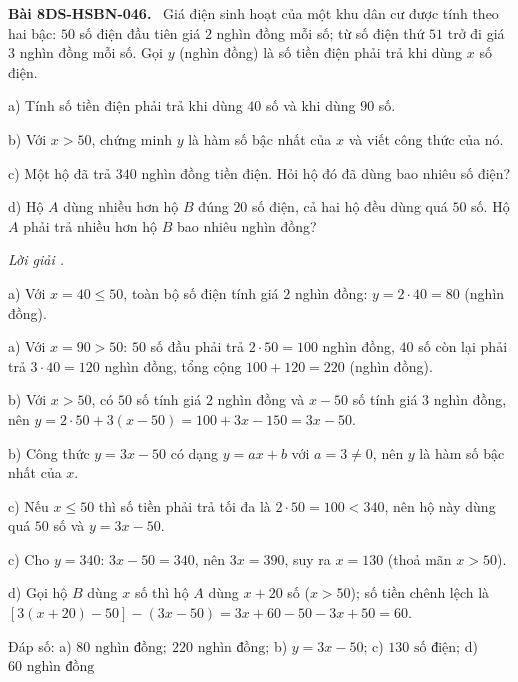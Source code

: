 \documentclass[12pt,a4paper]{article}
\newenvironment{problem}[1][]{\par\medskip\noindent\textbf{Bài #1.}\ }{\par}
\newenvironment{solution}[1][]{\par\noindent\textit{Lời giải #1.}\par}{\par}
\begin{document}
\begin{problem}[8DS-HSBN-046]
Giá điện sinh hoạt của một khu dân cư được tính theo hai bậc: $50$ số điện đầu tiên giá $2$ nghìn đồng mỗi số; từ số điện thứ $51$ trở đi giá $3$ nghìn đồng mỗi số. Gọi $y$ (nghìn đồng) là số tiền điện phải trả khi dùng $x$ số điện.

a) Tính số tiền điện phải trả khi dùng $40$ số và khi dùng $90$ số.

b) Với $x > 50$, chứng minh $y$ là hàm số bậc nhất của $x$ và viết công thức của nó.

c) Một hộ đã trả $340$ nghìn đồng tiền điện. Hỏi hộ đó đã dùng bao nhiêu số điện?

d) Hộ $A$ dùng nhiều hơn hộ $B$ đúng $20$ số điện, cả hai hộ đều dùng quá $50$ số. Hộ $A$ phải trả nhiều hơn hộ $B$ bao nhiêu nghìn đồng?

\begin{solution}
a) Với $x = 40 \leq 50$, toàn bộ số điện tính giá $2$ nghìn đồng: $y = 2 \cdot 40 = 80$ (nghìn đồng).

a) Với $x = 90 > 50$: $50$ số đầu phải trả $2 \cdot 50 = 100$ nghìn đồng, $40$ số còn lại phải trả $3 \cdot 40 = 120$ nghìn đồng, tổng cộng $100 + 120 = 220$ (nghìn đồng).

b) Với $x > 50$, có $50$ số tính giá $2$ nghìn đồng và $x - 50$ số tính giá $3$ nghìn đồng, nên $y = 2 \cdot 50 + 3(x - 50) = 100 + 3x - 150 = 3x - 50$.

b) Công thức $y = 3x - 50$ có dạng $y = ax + b$ với $a = 3 \neq 0$, nên $y$ là hàm số bậc nhất của $x$.

c) Nếu $x \leq 50$ thì số tiền phải trả tối đa là $2 \cdot 50 = 100 < 340$, nên hộ này dùng quá $50$ số và $y = 3x - 50$.

c) Cho $y = 340$: $3x - 50 = 340$, nên $3x = 390$, suy ra $x = 130$ (thoả mãn $x > 50$).

d) Gọi hộ $B$ dùng $x$ số thì hộ $A$ dùng $x + 20$ số ($x > 50$); số tiền chênh lệch là $[3(x + 20) - 50] - (3x - 50) = 3x + 60 - 50 - 3x + 50 = 60$.

Đáp số: a) $\boxed{80 \text{ nghìn đồng};\ 220 \text{ nghìn đồng}}$; b) $\boxed{y = 3x - 50}$; c) $\boxed{130 \text{ số điện}}$; d) $\boxed{60 \text{ nghìn đồng}}$
\end{solution}
\end{problem}
\end{document}
